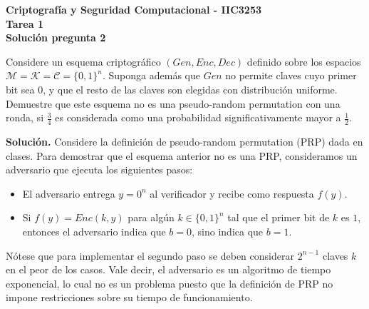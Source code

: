 \documentclass[11pt]{article}
\begin{document}
\begin{center}
  \bf Criptografía y Seguridad Computacional - IIC3253\\
  \bf Tarea 1\\
  \bf Solución pregunta 2
\end{center}

\bigskip

\noindent
Considere un esquema criptográfico $(\textit{Gen}, \textit{Enc}, \textit{Dec})$ definido sobre los espacios $\mathcal{M} = \mathcal{K} = \mathcal{C} = \{0,1\}^n$. Suponga además que $\textit{Gen}$ no permite claves cuyo primer bit sea $0$, y que el resto de las claves son elegidas con distribución uniforme. Demuestre que este esquema no es una pseudo-random permutation con una ronda, si $\frac{3}{4}$ es considerada como una probabilidad significativamente mayor a $\frac{1}{2}.$

\bigskip

\noindent
{\bf Solución.} Considere la definición de pseudo-random permutation
(PRP) dada en clases. Para demostrar que el esquema anterior no es una
PRP, consideramos un adversario que ejecuta los siguientes pasos:
\begin{itemize}
  \item El adversario entrega $y = 0^n$ al verificador y recibe como respuesta $f(y)$.
  \item Si $f(y) = \textit{Enc}(k,y)$ para algún $k \in \{0,1\}^n$ tal que el primer bit de $k$ es $1$, entonces el adversario indica que $b=0$, sino indica que $b=1$.
\end{itemize}
Nótese que para implementar el segundo paso se deben considerar
$2^{n-1}$ claves $k$ en el peor de los casos. Vale decir, el
adversario es un algoritmo de tiempo exponencial, lo cual no es un
problema puesto que la definición de PRP no impone restricciones sobre
su tiempo de funcionamiento.
\end{document}
